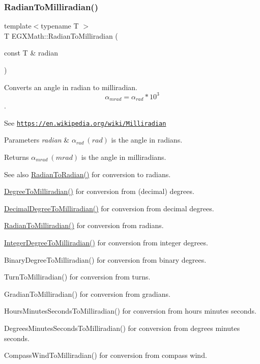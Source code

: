 \subsubsection{\texorpdfstring{Radian\+To\+Milliradian()}{RadianToMilliradian()}}
{\footnotesize\ttfamily template$<$typename T $>$ \\
T E\+G\+X\+Math\+::\+Radian\+To\+Milliradian (\begin{DoxyParamCaption}\item[{const T \&}]{radian }\end{DoxyParamCaption})}



Converts an angle in radian to milliradian. \[\alpha_{mrad}=\alpha_{rad}*10^3\]. 

See \href{https://en.wikipedia.org/wiki/Milliradian}{\tt https\+://en.\+wikipedia.\+org/wiki/\+Milliradian} 
\begin{DoxyParams}{Parameters}
{\em radian} & $\alpha_{rad}\ (rad)$ is the angle in radians. \\
\hline
\end{DoxyParams}
\begin{DoxyReturn}{Returns}
$\alpha_{mrad}\ (mrad)$ is the angle in milliradians. 
\end{DoxyReturn}
\begin{DoxySeeAlso}{See also}
\mbox{\hyperlink{group___e_g_x_math-_angle_conversions-_radian_gae08681bd86b8e7e4325f6c8cb3a0dc37}{Radian\+To\+Radian()}} for conversion to radians. 

\mbox{\hyperlink{group___e_g_x_math-_angle_conversions-_degree_gae4fa6c2d3805430760783650cfbfdb11}{Degree\+To\+Milliradian()}} for conversion from (decimal) degrees. 

\mbox{\hyperlink{group___e_g_x_math-_angle_conversions-_decimal_degree_gab567d02d4692d9642a4ad219e479713a}{Decimal\+Degree\+To\+Milliradian()}} for conversion from decimal degrees. 

\mbox{\hyperlink{group___e_g_x_math-_angle_conversions-_radian_gaea391f0cca39b05e298dd1cae162e7f1}{Radian\+To\+Milliradian()}} for conversion from radians. 

\mbox{\hyperlink{group___e_g_x_math-_angle_conversions-_integer_degree_ga5379a68bdff5cc4fab5bb1ba06ef9453}{Integer\+Degree\+To\+Milliradian()}} for conversion from integer degrees. 

Binary\+Degree\+To\+Milliradian() for conversion from binary degrees. 

Turn\+To\+Milliradian() for conversion from turns. 

Gradian\+To\+Milliradian() for conversion from gradians. 

Hours\+Minutes\+Seconds\+To\+Milliradian() for conversion from hours minutes seconds. 

Degrees\+Minutes\+Seconds\+To\+Milliradian() for conversion from degrees minutes seconds. 

Compass\+Wind\+To\+Milliradian() for conversion from compass wind. 
\end{DoxySeeAlso}
